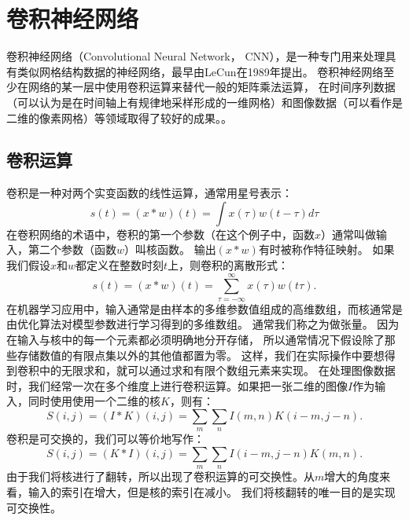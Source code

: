 \section{卷积神经网络}
卷积神经网络（Convolutional Neural Network， CNN），是一种专门用来处理具有类似网格结构数据的神经网络，最早由LeCun在1989年提出\cite{lecun1989backpropagation}。
卷积神经网络至少在网络的某一层中使用卷积运算来替代一般的矩阵乘法运算，
在时间序列数据（可以认为是在时间轴上有规律地采样形成的一维网格）和图像数据（可以看作是二维的像素网格）等领域取得了较好的成果。。\par

\subsection{卷积运算}
\label{sec:the_convolution_operation}
卷积是一种对两个实变函数的线性运算，通常用星号表示：
\begin{equation}
s(t) = (x*w)(t) = \int x(\tau)w(t-\tau)d\tau
\end{equation}
在卷积网络的术语中，卷积的第一个参数（在这个例子中，函数$x$）通常叫做输入，第二个参数（函数$w$）叫核函数。
输出$ (x*w)$有时被称作特征映射。
如果我们假设$x$和$w$都定义在整数时刻$t$上，则卷积的离散形式：
\begin{equation}
s(t) = (x*w)(t) = \sum_{\tau = -\infty}^{\infty} x(\tau)w(t\tau).
\end{equation}
在机器学习应用中，输入通常是由样本的多维参数值组成的高维数组，而核通常是由优化算法对模型参数进行学习得到的多维数组。
通常我们称之为做张量。
因为在输入与核中的每一个元素都必须明确地分开存储，
所以通常情况下假设除了那些存储数值的有限点集以外的其他值都置为零。
这样，我们在实际操作中要想得到卷积中的无限求和，就可以通过求和有限个数组元素来实现。
在处理图像数据时，我们经常一次在多个维度上进行卷积运算。如果把一张二维的图像$I$作为输入，同时使用使用一个二维的核$K$，则有：
\begin{equation}
S(i,j) = (I*K)(i,j) = \sum_m \sum_n I(m,n) K(i-m, j-n).
\end{equation}
卷积是可交换的，我们可以等价地写作：
\begin{equation}
	S(i, j) = (K*I)(i,j) = \sum_m \sum_n I(i-m, j-n) K(m, n).
\end{equation}
由于我们将核进行了翻转，所以出现了卷积运算的可交换性。从$m$增大的角度来看，输入的索引在增大，但是核的索引在减小。
我们将核翻转的唯一目的是实现可交换性。\par

